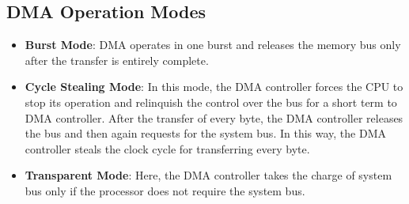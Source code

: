 \documentclass{article}
\theoremstyle{plain}
\theoremstyle{definition}
\begin{document}
\subsection{DMA Operation Modes}
\begin{itemize}
    \item \textbf{Burst Mode}: DMA operates in one burst and releases the memory bus only after the transfer is entirely complete. 
    
    \item \textbf{Cycle Stealing Mode}: In this mode, the DMA controller forces the CPU to stop its operation and relinquish the control over the bus for a short term to DMA controller. After the transfer of every byte, the DMA controller releases the bus and then again requests for the system bus. In this way, the DMA controller steals the clock cycle for transferring every byte.
    
    \item \textbf{Transparent Mode}: Here, the DMA controller takes the charge of system bus only if the processor does not require the system bus.
\end{itemize}
\end{document}
